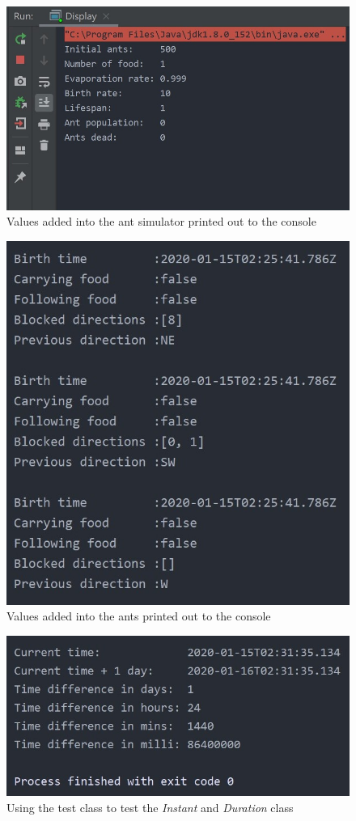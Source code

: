 \documentclass[a4paper, oneside, 11pt]{report}
\begin{document}
\begin{figure}[htb]
	\begin{center}
		\includegraphics[width=0.6 \columnwidth]{Ant_Simulator_Values.jpg}
		\caption{Values added into the ant simulator printed out to the console}
		\label{fig:Ant_Simulator_Values}
	\end{center}
\end{figure}

\begin{figure}[htb]
	\begin{center}
		\includegraphics[width=0.6 \columnwidth]{Ant_Values.jpg}
		\caption{Values added into the ants printed out to the console}
		\label{fig:Ant_Values}
	\end{center}
\end{figure}

\begin{figure}[htb]
	\begin{center}
		\includegraphics[width=0.6 \columnwidth]{Test_Class.jpg}
		\caption{Using the test class to test the \textit{Instant} and \textit{Duration} class}
		\label{fig:Test_Class}
	\end{center}
\end{figure}
\end{document}
